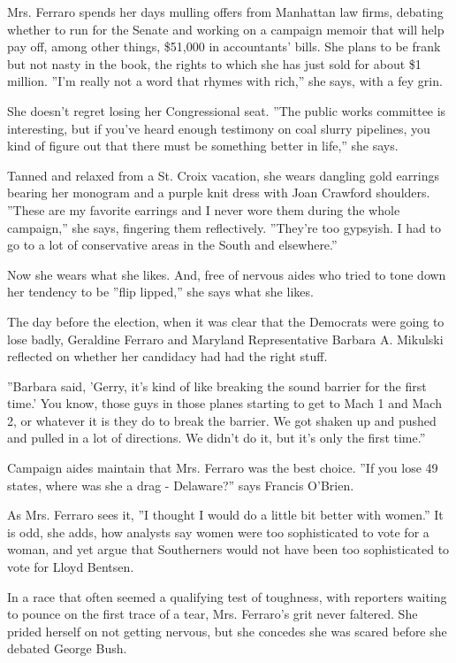Mrs. Ferraro spends her days mulling offers from Manhattan law firms,
debating whether to run for the Senate and working on a campaign memoir
that will help pay off, among other things, \$51,000 in accountants'
bills. She plans to be frank but not nasty in the book, the rights to
which she has just sold for about \$1 million. ''I'm really not a word
that rhymes with rich,'' she says, with a fey grin.

She doesn't regret losing her Congressional seat. ''The public works
committee is interesting, but if you've heard enough testimony on coal
slurry pipelines, you kind of figure out that there must be something
better in life,'' she says.

Tanned and relaxed from a St. Croix vacation, she wears dangling gold
earrings bearing her monogram and a purple knit dress with Joan Crawford
shoulders. ''These are my favorite earrings and I never wore them during
the whole campaign,'' she says, fingering them reflectively. ''They're
too gypsyish. I had to go to a lot of conservative areas in the South
and elsewhere.''

Now she wears what she likes. And, free of nervous aides who tried to
tone down her tendency to be ''flip lipped,'' she says what she likes.

The day before the election, when it was clear that the Democrats were
going to lose badly, Geraldine Ferraro and Maryland Representative
Barbara A. Mikulski reflected on whether her candidacy had had the right
stuff.

''Barbara said, 'Gerry, it's kind of like breaking the sound barrier for
the first time.' You know, those guys in those planes starting to get to
Mach 1 and Mach 2, or whatever it is they do to break the barrier. We
got shaken up and pushed and pulled in a lot of directions. We didn't do
it, but it's only the first time.''

Campaign aides maintain that Mrs. Ferraro was the best choice. ''If you
lose 49 states, where was she a drag - Delaware?'' says Francis O'Brien.

As Mrs. Ferraro sees it, ''I thought I would do a little bit better with
women.'' It is odd, she adds, how analysts say women were too
sophisticated to vote for a woman, and yet argue that Southerners would
not have been too sophisticated to vote for Lloyd Bentsen.

In a race that often seemed a qualifying test of toughness, with
reporters waiting to pounce on the first trace of a tear, Mrs. Ferraro's
grit never faltered. She prided herself on not getting nervous, but she
concedes she was scared before she debated George Bush.

